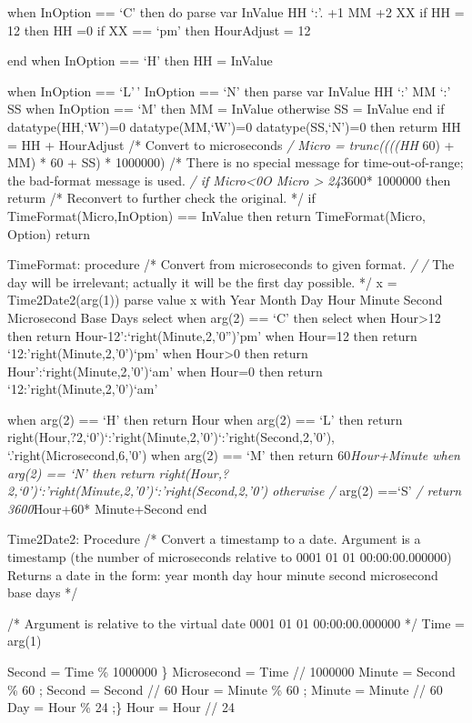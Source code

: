 when InOption == `C' then do parse var InValue HH `:'. +1 MM +2 XX if HH
= 12 then HH =0 if XX == `pm' then HourAdjust = 12

end when InOption == `H' then HH = InValue

when InOption == `L'\,' \textbar{} InOption == `N' then parse var
InValue HH `:' MM `:' SS when InOption == `M' then MM = InValue
otherwise SS = InValue end if datatype(HH,`W')=0 \textbar{}
datatype(MM,`W')=0 \textbar{} datatype(SS,`N')=0 then returm HH = HH +
HourAdjust /* Convert to microseconds \emph{/ Micro = trunc((((HH } 60)
+ MM) * 60 + SS) * 1000000) /* There is no special message for
time-out-of-range; the bad-format message is used. \emph{/ if
Micro\textless0O \textbar{} Micro \textgreater{} 24}3600* 1000000 then
returm /* Reconvert to further check the original. */ if
TimeFormat(Micro,InOption) == InValue then return TimeFormat(Micro,
Option) return

TimeFormat: procedure /* Convert from microseconds to given format.
\emph{/ /} The day will be irrelevant; actually it will be the first day
possible. */ x = Time2Date2(arg(1)) parse value x with Year Month Day
Hour Minute Second Microsecond Base Days select when arg(2) == `C' then
select when Hour\textgreater12 then return
Hour-12':`right(Minute,2,'0'')'pm' when Hour=12 then return
`12:'right(Minute,2,'0')`pm' when Hour\textgreater0 then return
Hour':`right(Minute,2,'0')`am' when Hour=0 then return
`12:'right(Minute,2,'0')`am'

when arg(2) == `H' then return Hour when arg(2) == `L' then return
right(Hour,?2,`0')`:'right(Minute,2,'0')`:'right(Second,2,'0'),
\textbar\textbar{} `.'right(Microsecond,6,'0') when arg(2) == `M' then
return 60\emph{Hour+Minute when arg(2) == `N' then return
right(Hour,?2,`0')`:'right(Minute,2,'0')`:'right(Second,2,'0') otherwise
/} arg(2) ==`S' \emph{/ return 3600}Hour+60* Minute+Second end

Time2Date2: Procedure /* Convert a timestamp to a date. Argument is a
timestamp (the number of microseconds relative to 0001 01 01
00:00:00.000000) Returns a date in the form: year month day hour minute
second microsecond base days */

/* Argument is relative to the virtual date 0001 01 01 00:00:00.000000
*/ Time = arg(1)

Second = Time \% 1000000 \} Microsecond = Time // 1000000 Minute =
Second \% 60 ; Second = Second // 60 Hour = Minute \% 60 ; Minute =
Minute // 60 Day = Hour \% 24 ;\} Hour = Hour // 24

